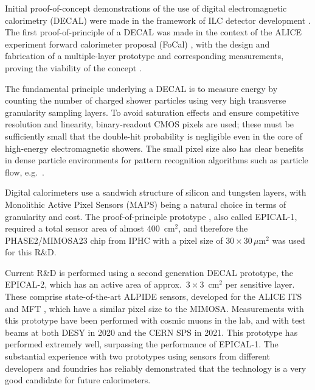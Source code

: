 Initial proof-of-concept demonstrations of the use of digital electromagnetic calorimetry (DECAL) were made in the framework of ILC detector development \cite{Ballin:2008db,Ballin:2009yv,Dauncey:2010zz}.  The first proof-of-principle of a DECAL was made in the context of the ALICE experiment forward calorimeter proposal (FoCal) \cite{ALICE:2020mso}, with the design and fabrication of a multiple-layer prototype and corresponding measurements, proving the viability of the concept \cite{deHaas:2017fkf}.

The fundamental principle underlying a DECAL is to measure energy by counting the number of charged shower particles using very high transverse granularity sampling layers.  To avoid saturation effects and ensure competitive resolution and linearity, binary-readout CMOS pixels are used; these must be sufficiently small that the double-hit probability is negligible even in the core of high-energy electromagnetic showers.  The small pixel size also has clear benefits in dense particle environments for pattern recognition algorithms such as particle flow, e.g.\ \cite{Brient:2001fow}.

Digital calorimeters use a sandwich structure of silicon and tungsten layers, with Monolithic Active Pixel Sensors (MAPS) being a natural choice in terms of granularity and cost.
The proof-of-principle prototype \cite{deHaas:2017fkf}, also called EPICAL-1, required a total sensor area of almost 400~cm$^2$, and therefore the  PHASE2/MIMOSA23 chip from IPHC \cite{Winter:2010zz} with a pixel size of $30 \times 30 \, \mu \mathrm{m}^2$ was used for this R\&D.

Current R\&D is performed using a second generation DECAL prototype, the EPICAL-2, which has an active area of approx.\ $3\times 3$~cm$^{2}$ per sensitive layer. These comprise state-of-the-art ALPIDE sensors, developed for the ALICE ITS and MFT \cite{AglieriRinella:2017lym}, which have a similar pixel size to the MIMOSA.  Measurements with this prototype have been performed with cosmic muons in the lab, and with test beams at both DESY in 2020 and the CERN SPS in 2021. This prototype has performed extremely well, surpassing the performance of EPICAL-1. The substantial experience with two prototypes using sensors from different developers and foundries has reliably demonstrated that the technology is a very good candidate for future calorimeters.

